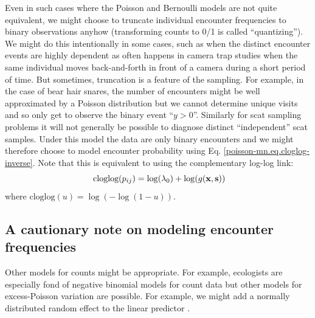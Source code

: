Even in such cases 
where the Poisson and
Bernoulli models are
not quite 
equivalent, we might choose to truncate
individual encounter frequencies to binary observations anyhow
(transforming counts to 0/1 is called ``quantizing'').  We might do
this intentionally in some cases, such as when the distinct encounter events are
highly dependent as often happens in camera trap studies when the same
individual moves back-and-forth in front of a camera during a short
period of time. 
But sometimes, 
truncation is a feature of the sampling. For example, in the case of
bear hair snares, the number of encounters might be well approximated
by a Poisson distribution but we cannot determine unique visits and so
only get to observe the binary event ``$y>0$''. Similarly for scat
sampling problems it will not generally be possible to diagnose
distinct ``independent'' scat samples. Under this model the data are
only binary encounters and we might therefore choose to model
encounter probability
using Eq. \ref{poisson-mn.eq.cloglog-inverse}.
Note that this is equivalent to using the complementary log-log link:
\[
\mbox{ cloglog}(p_{ij}) = \log(\lambda_{0})  + \log(g({\bf x},{\bf s}))
\]
where $\mbox{cloglog}(u) = \log(-\log(1-u))$.

\subsection{A cautionary note on modeling encounter frequencies}

Other models for counts might be appropriate. For example, ecologists
are especially fond of negative binomial models for count data
\citep{verhoef_boveng:2007,white_bennetts:1996,kery_etal:2005}
but other models for excess-Poisson variation are possible. For
example, we might add a normally distributed random effect to
the linear predictor \citep{coull_agresti:1999}.

